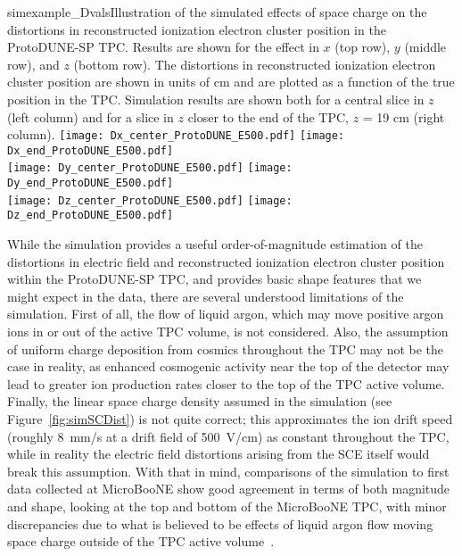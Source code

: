 \begin{cdrfigure}{simexample_Dvals}{Illustration of the simulated effects of space charge on the distortions in reconstructed ionization electron cluster position in the ProtoDUNE-SP TPC.  Results are shown for the effect in $x$ (top row), $y$ (middle row), and $z$ (bottom row).  The distortions in reconstructed ionization electron cluster position are shown in units of cm and are plotted as a function of the true position in the TPC.  Simulation results are shown both for a central slice in $z$ (left column) and for a slice in $z$ closer to the end of the TPC, $z$ = 19 cm (right column).}
\texttt{[image: Dx\_center\_ProtoDUNE\_E500.pdf]}
\texttt{[image: Dx\_end\_ProtoDUNE\_E500.pdf]}
\\
\texttt{[image: Dy\_center\_ProtoDUNE\_E500.pdf]}
\texttt{[image: Dy\_end\_ProtoDUNE\_E500.pdf]}
\\
\texttt{[image: Dz\_center\_ProtoDUNE\_E500.pdf]}
\texttt{[image: Dz\_end\_ProtoDUNE\_E500.pdf]}
\end{cdrfigure}



While the simulation provides a useful order-of-magnitude estimation of the distortions in electric field and reconstructed ionization electron cluster position within the ProtoDUNE-SP TPC, and provides basic shape features that we might expect in the data, there are several understood limitations of the simulation.  First of all, the flow of liquid argon, which may move positive argon ions in or out of the active TPC volume, is not considered.  Also, the assumption of uniform charge deposition from cosmics throughout the TPC may not be the case in reality, as enhanced cosmogenic activity near the top of the detector may lead to greater ion production rates closer to the top of the TPC active volume.  Finally, the linear space charge density assumed in the simulation (see Figure~\ref{fig:simSCDist}) is not quite correct; this approximates the ion drift speed (roughly 8~mm/s at a drift field of 500~V/cm) as constant throughout the TPC, while in reality the electric field distortions arising from the SCE itself would break this assumption.  With that in mind, comparisons of the simulation to first data collected at MicroBooNE show good agreement in terms of both magnitude and shape, looking at the top and bottom of the MicroBooNE TPC, with minor discrepancies due to what is believed to be effects of liquid argon flow moving space charge outside of the TPC active volume~\cite{SCEnoteMicroBooNE}.

